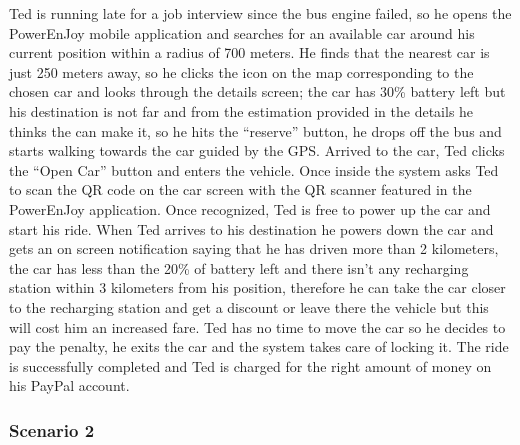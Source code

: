 \documentclass[]{article}
\begin{document}
Ted is running late for a job interview since the bus engine failed, so
he opens the PowerEnJoy mobile application and searches for an available
car around his current position within a radius of 700 meters. He finds
that the nearest car is just 250 meters away, so he clicks the icon on
the map corresponding to the chosen car and looks through the details
screen; the car has 30\% battery left but his destination is not far and
from the estimation provided in the details he thinks the can make it,
so he hits the ``reserve'' button, he drops off the bus and starts
walking towards the car guided by the GPS. Arrived to the car, Ted
clicks the ``Open Car'' button and enters the vehicle. Once inside the
system asks Ted to scan the QR code on the car screen with the QR
scanner featured in the PowerEnJoy application. Once recognized, Ted is
free to power up the car and start his ride. When Ted arrives to his
destination he powers down the car and gets an on screen notification
saying that he has driven more than 2 kilometers, the car has less than
the 20\% of battery left and there isn't any recharging station within 3
kilometers from his position, therefore he can take the car closer to
the recharging station and get a discount or leave there the vehicle but
this will cost him an increased fare. Ted has no time to move the car so
he decides to pay the penalty, he exits the car and the system takes
care of locking it. The ride is successfully completed and Ted is
charged for the right amount of money on his PayPal account.

\subsubsection{Scenario 2}\label{scenario-2}
\end{document}
